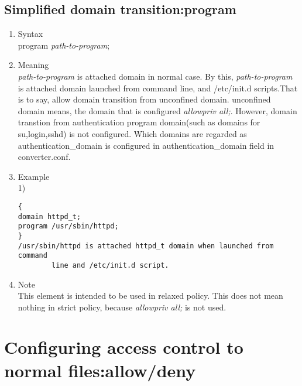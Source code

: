 \documentclass{article}
\begin{document}
\subsection{Simplified domain transition:program}\label{sec:program}
\begin{enumerate}
 \item Syntax\\
    program {\it path-to-program};
 \item Meaning\\
    {\it path-to-program} is attached domain in normal case.   By this, {\it path-to-program} is attached domain launched from
       command line, and /etc/init.d scripts.That is to
       say, allow domain transition from unconfined domain. unconfined
       domain means, the domain that is configured {\it allowpriv all;}.
    However, domain transtion from authentication program domain(such as
       domains for su,login,sshd) is not configured. Which domains are
       regarded as authentication\_domain is configured in
       authentication\_domain field in converter.conf.\\
 \item Example\\
1)
\begin{verbatim}
{
domain httpd_t;
program /usr/sbin/httpd;
}
/usr/sbin/httpd is attached httpd_t domain when launched from command
		line and /etc/init.d script.
\end{verbatim}
 \item Note\\
    This element is intended to be used in relaxed policy. This does not
       mean nothing in strict policy, because {\it
       allowpriv all;} is not used.
\end{enumerate}


\section{Configuring access control to normal files:allow/deny}
\end{document}
